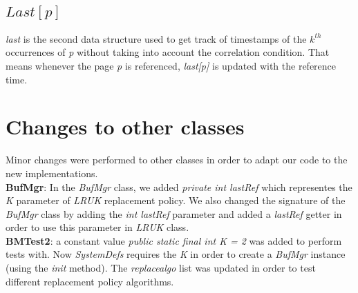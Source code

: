 \documentclass{article}
\begin{document}
\subsection{$Last[p]$}
\textit{last} is the second data structure used to get track of timestamps of the $k^{th}$ occurrences of \textit{p} without taking into account the correlation condition. That means whenever the page \textit{p} is referenced, \textit{last[p]} is updated with the reference time.

\section{Changes to other classes}
Minor changes were performed to other classes in order to adapt our code to the new implementations.\\
\textbf{BufMgr}: In the \textit{BufMgr} class, we added \textit{private int lastRef} which representes the \textit{K} parameter of \textit{LRUK} replacement policy. We also changed the signature of the \textit{BufMgr} class by adding the \textit{int lastRef} parameter and added a \textit{lastRef} getter in order to use this parameter in \textit{LRUK} class.\\
\textbf{BMTest2}: a constant value \textit{public static final int K = 2} was added to perform tests with. Now  \textit{SystemDefs} requires the \textit{K} in order to create a \textit{BufMgr} instance (using the \textit{init} method). The \textit{replacealgo} list was updated in order to test different replacement policy algorithms.\\




\end{document}

